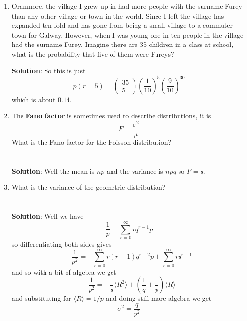 \documentclass[11pt,a4paper]{scrartcl}
\begin{document}
\begin{enumerate}

\item Oranmore, the village I grew up in had more people with the
  surname Furey than any other village or town in the world. Since I
  left the village has expanded ten-fold and has gone from being a
  small village to a commuter town for Galway. However, when I was young
  one in ten people in the village had the surname Furey. Imagine
  there are 35 children in a class at school, what is the probability
  that five of them were Fureys?

  \textbf{Solution}: So this is just
  \begin{equation}
    p(r=5)=\left(\begin{array}{c}35\\5\end{array}\right) \left(\frac{1}{10}\right)^{5}\left(\frac{9}{10}\right)^{30}
\end{equation}
which is about $0.14$.
  
\item The \textbf{Fano factor} is sometimes used to describe distributions, it is
  \begin{equation}
    F=\frac{\sigma^2}{\mu}
  \end{equation}
What is the Fano factor for the Poisson distribution?\\
\\ \\
\textbf{Solution}: Well the mean is $np$ and the variance is $npq$ so $F=q$.

\item What is the variance of the geometric distribution?\\ \\ \\
  \textbf{Solution}: Well we have
  \begin{equation}
    \frac{1}{p}=\sum_{r=0}^\infty rq^{r-1}p
  \end{equation}
  so differentiating both sides gives
  \begin{equation}
    -\frac{1}{p^2}=-\sum_{r=0}^\infty r(r-1)q^{r-2}p+\sum_{r=0}^\infty rq^{r-1}
  \end{equation}
  and so with a bit of algebra we get
  \begin{equation}
    -\frac{1}{p^2}=-\frac{1}{q}\langle R^2\rangle+\left(\frac{1}{q}+\frac{1}{p}\right)\langle R\rangle
  \end{equation}
  and substituting for $\langle R\rangle=1/p$ and doing still more algebra we get
  \begin{equation}
    \sigma^2=\frac{q}{p^2}
  \end{equation}


\end{enumerate}
\end{document}
